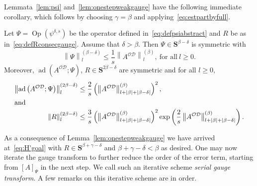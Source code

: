 \documentclass[10pt]{amsart}
\theoremstyle{definition}\newtheorem{defi}[theo]{Definition}\newtheorem{rema}[theo]{Remark}\newtheorem{exam}[theo]{Example}\newtheorem{nota}[theo]{Notation}
\DeclareMathOperator{\ad}{ad}
\DeclareMathOperator{\Op}{Op}
\newcommand{\CD}{\mathcal{D}}
\newcommand{\CO}{\mathcal{O}}
\newcommand{\COD}{{\CO\CD}}
\newcommand{\BS}{\mathbf S}
\newcommand{\resc}{s}
\newcommand{\abs}[1]{\left\lvert #1 \right\rvert}
\newcommand{\snorm}[3]{\left\| #1\right\|_{#3}^{(#2)}}
\begin{document}
Lemmata~\ref{lem:psi} and~\ref{lem:onestepweakgauge} have the following immediate corollary, which follows by choosing $\gamma=\beta$ and applying~\eqref{eq:estpartbyfull}.
\begin{coro}\label{cor:onestepweakgauge}
Let $\Psi=\Op(\psi^{\delta, s})$ be the operator defined in~\eqref{eq:defpsiabstract} and $R$ be as in~\eqref{eq:defRconsecgauge}. Assume that $\delta>\beta$. Then $\Psi \in \BS^{\beta-\delta}$ is symmetric with
\begin{equation}\label{eq:estimatepsinormcor}
\snorm{\Psi}{\beta - \delta}{l} \le \frac 1 \resc \snorm{A^\COD}{\beta}{l}, \ \text{for all}\ l\geq 0.
\end{equation}
Moreover, $\ad(A^\COD;\Psi)$, $R\in \BS^{2\beta- \delta}$ are symmetric and for all $l\geq 0$,
\begin{align}
\snorm{\ad\left(A^\COD;\Psi\right)}{2\beta-\delta}{l}&\le \frac{2}{\resc} \left(\snorm{A^\COD}{\beta}{l + \abs\beta + \abs{\beta - \delta}}\right)^2,
\\
\intertext{and}
\snorm{R}{2\beta-\delta}l &\le \frac{3}{\resc} \left(\snorm{A^\COD}{\beta}{l + \abs\beta + \abs{\beta - \delta}}\right)^2 \exp\left(\frac 2 \resc \snorm{A^\COD}{\beta}{l + \abs\beta+\abs{\beta - \delta}}\right).\label{eq:Rnormboundsweakcor}
\end{align}
\end{coro}
As a consequence of Lemma~\ref{lem:onestepweakgauge} we have arrived at~\eqref{eq:H'goal} with $R\in\BS^{\beta+\gamma-\delta}$ and $\beta+\gamma-\delta<\beta$ as desired. One may now iterate the gauge transform to further reduce the order of the error term, starting from $[A]_\Psi$ in the next step. We call such an iterative scheme
\emph{serial gauge transform}. A few remarks on this iterative scheme are in order.
\end{document}

